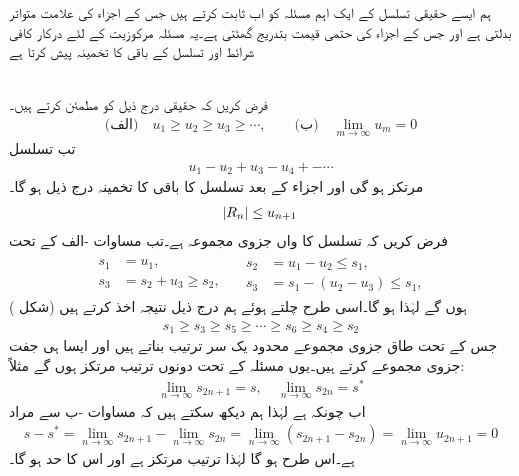 ہم ایسے حقیقی تسلسل کے ایک اہم مسئلہ کو اب ثابت کرتے ہیں جس کے اجزاء کی علامت متواتر بدلتی ہے اور جس کے اجزاء کی حتمی قیمت بتدریج گھٹتی ہے۔یہ مسئلہ مرکوزیت کے لئے درکار کافی شرائط  اور تسلسل کے باقی کا تخمینہ پیش کرتا ہے

\quad {}\\
فرض کریں کہ حقیقی  درج ذیل کو مطمئن کرتے ہیں۔
\begin{align}\label{مسئلہ_ترتیب_آزمائش_لیبنٹز_الف}
\text{(الف)}\quad u_1\ge u_2\ge u_3\ge \cdots,\quad \quad \text{(ب)}\quad \lim_{m\to\infty} u_m=0
\end{align}
تب تسلسل
\begin{align*}
u_1-u_2+u_3-u_4+-\cdots
\end{align*}
مرتکز ہو گی اور  اجزاء کے بعد تسلسل کا باقی کا تخمینہ درج ذیل ہو گا۔
\begin{align}\label{مسئلہ_ترتیب_آزمائش_لیبنٹز_ب}
\abs{R_n}\le u_{n+1}
\end{align}
\quad
فرض کریں کہ  تسلسل کا  واں جزوی مجموعہ ہے۔تب  مساوات -الف کے تحت 
\begin{gather*}
\begin{aligned}
s_1&=u_1,\\
s_3&=s_2+u_3\ge s_2,
\end{aligned}\quad
\begin{aligned}
 s_2&=u_1-u_2\le s_1,\\
 s_3&=s_1-(u_2-u_3)\le s_1,
\end{aligned}
\end{gather*}
ہوں گے لہٰذا  ہو گا۔اسی طرح چلتے ہوئے ہم درج ذیل نتیجہ اخذ کرتے ہیں (شکل )
\begin{align}\label{مسئلہ_ترتیب_آزمائش_لیبنٹز_پ}
s_1\ge s_3\ge s_5\ge \cdots\ge s_6\ge s_4\ge s_2
\end{align}
جس کے تحت طاق جزوی مجموعے محدود یک سر ترتیب بناتے ہیں اور ایسا ہی جفت جزوی مجموعے کرتے ہیں۔یوں مسئلہ  کے تحت دونوں ترتیب مرتکز ہوں گے مثلاً:
\begin{align*}
\lim_{n\to\infty} s_{2n+1}=s,\quad \lim_{n\to\infty} s_{2n}=s^*
\end{align*} 
اب چونکہ  ہے لہٰذا ہم دیکھ سکتے ہیں کہ مساوات -ب سے مراد 
\begin{align*}
s-s^*=\lim_{n\to\infty}s_{2n+1}-\lim_{n\to\infty}s_{2n}=\lim_{n\to\infty}(s_{2n+1}-s_{2n})=\lim_{n\to\infty} u_{2n+1}=0
\end{align*}
ہے۔اس طرح   ہو گا لہٰذا  ترتیب مرتکز ہے اور اس کا حد  ہو گا۔

